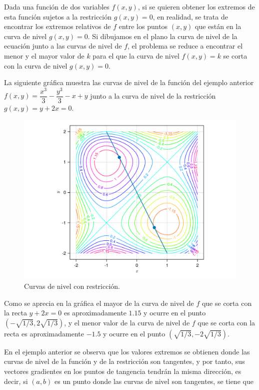 \documentclass[
  a4paper,
]{scrreport}
\theoremstyle{definition}
\theoremstyle{plain}
\theoremstyle{plain}
\theoremstyle{definition}
\theoremstyle{definition}
\theoremstyle{plain}
\theoremstyle{remark}
\begin{document}
Dada una función de dos variables \(f(x,y)\), si se quieren obtener los
extremos de esta función sujetos a la restricción \(g(x,y)=0\), en
realidad, se trata de encontrar los extremos relativos de \(f\) entre
los puntos \((x,y)\) que están en la curva de nivel \(g(x,y)=0\). Si
dibujamos en el plano la curva de nivel de la ecuación junto a las
curvas de nivel de \(f\), el problema se reduce a encontrar el menor y
el mayor valor de \(k\) para el que la curva de nivel \(f(x,y)=k\) se
corta con la curva de nivel \(g(x,y)=0\).

La siguiente gráfica muestra las curvas de nivel de la función del
ejemplo anterior \(f(x,y)=\dfrac{x^3}{3}-\dfrac{y^3}{3}-x+y\) junto a la
curva de nivel de la restricción \(g(x,y)=y+2x=0\).

\begin{figure}

{\centering \includegraphics{img/derivadas-funciones-varias-variables/multiplicadores-lagrange.pdf}

}

\caption{Curvas de nivel con restricción.}

\end{figure}

Como se aprecia en la gráfica el mayor de la curva de nivel de \(f\) que
se corta con la recta \(y+2x=0\) es aproximadamente \(1.15\) y ocurre en
el punto \((-\sqrt{1/3}, 2\sqrt{1/3})\), y el menor valor de la curva de
nivel de \(f\) que se corta con la recta es aproximadamente \(-1.5\) y
ocurre en el punto \((\sqrt{1/3}, -2\sqrt{1/3})\).

En el ejemplo anterior se observa que los valores extremos se obtienen
donde las curvas de nivel de la función y de la restricción son
tangentes, y por tanto, sus vectores gradientes en los puntos de
tangencia tendrán la misma dirección, es decir, si \((a,b)\) es un punto
donde las curvas de nivel son tangentes, se tiene que
\end{document}
